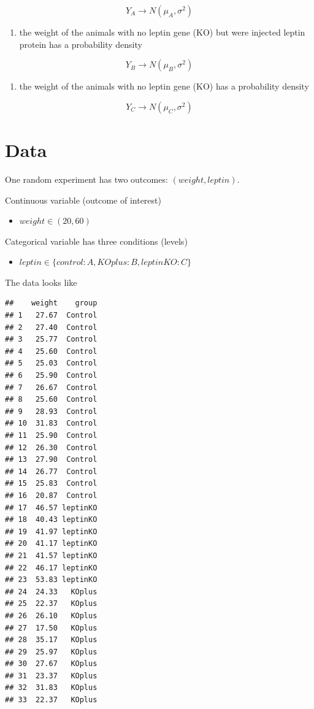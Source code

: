 \documentclass[
]{book}
\providecommand{\tightlist}{%
  \setlength{\itemsep}{0pt}\setlength{\parskip}{0pt}}
\begin{document}
\[Y_A \rightarrow N(\mu_A, \sigma^2)\]

\begin{enumerate}
\def\labelenumi{\arabic{enumi}.}
\setcounter{enumi}{1}
\tightlist
\item
  the weight of the animals with no leptin gene (KO) but were injected leptin protein has a probability density
\end{enumerate}

\[Y_B \rightarrow N(\mu_B, \sigma^2)\]

\begin{enumerate}
\def\labelenumi{\arabic{enumi}.}
\setcounter{enumi}{2}
\tightlist
\item
  the weight of the animals with no leptin gene (KO) has a probability density
\end{enumerate}

\[Y_C \rightarrow N(\mu_C, \sigma^2)\]

\hypertarget{data-3}{%
\section{Data}\label{data-3}}

One random experiment has two outcomes: \((weight, leptin)\).

Continuous variable (outcome of interest)

\begin{itemize}
\tightlist
\item
  \(weight \in (20, 60)\)
\end{itemize}

Categorical variable has three conditions (levels)

\begin{itemize}
\tightlist
\item
  \(leptin \in \{control:A,KOplus:B, leptinKO:C\}\)
\end{itemize}

The data looks like

\begin{verbatim}
##    weight    group
## 1   27.67  Control
## 2   27.40  Control
## 3   25.77  Control
## 4   25.60  Control
## 5   25.03  Control
## 6   25.90  Control
## 7   26.67  Control
## 8   25.60  Control
## 9   28.93  Control
## 10  31.83  Control
## 11  25.90  Control
## 12  26.30  Control
## 13  27.90  Control
## 14  26.77  Control
## 15  25.83  Control
## 16  20.87  Control
## 17  46.57 leptinKO
## 18  40.43 leptinKO
## 19  41.97 leptinKO
## 20  41.17 leptinKO
## 21  41.57 leptinKO
## 22  46.17 leptinKO
## 23  53.83 leptinKO
## 24  24.33   KOplus
## 25  22.37   KOplus
## 26  26.10   KOplus
## 27  17.50   KOplus
## 28  35.17   KOplus
## 29  25.97   KOplus
## 30  27.67   KOplus
## 31  23.37   KOplus
## 32  31.83   KOplus
## 33  22.37   KOplus
\end{verbatim}
\end{document}
